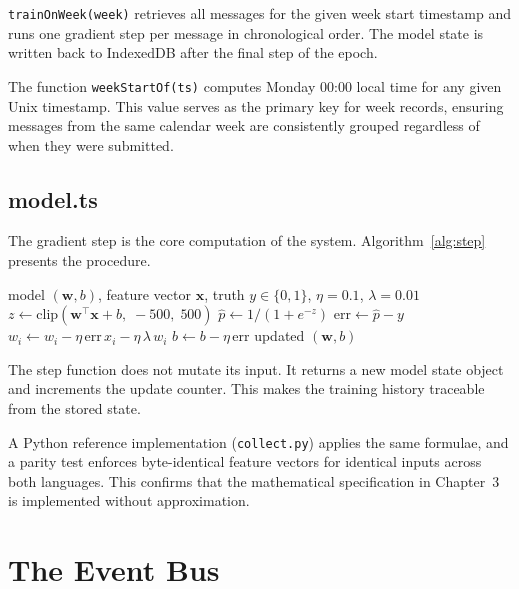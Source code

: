 \documentclass[11pt, a4paper]{report}
\begin{document}
\texttt{trainOnWeek(week)} retrieves all messages for the given week start
timestamp and runs one gradient step per message in chronological order.
The model state is written back to IndexedDB after the final step of the
epoch.

The function \texttt{weekStartOf(ts)} computes Monday 00:00 local time for
any given Unix timestamp. This value serves as the primary key for week
records, ensuring messages from the same calendar week are consistently
grouped regardless of when they were submitted.

\subsection{model.ts}

The gradient step is the core computation of the system. Algorithm~\ref{alg:step}
presents the procedure.

\begin{algorithm}[H]
\caption{Single gradient step}
\label{alg:step}
\begin{algorithmic}[1]
\Require model $(\mathbf{w}, b)$, feature vector $\mathbf{x}$,
         truth $y \in \{0,1\}$, $\eta = 0.1$, $\lambda = 0.01$
\State $z \leftarrow \mathrm{clip}(\mathbf{w}^\top\mathbf{x} + b,\;
       -500,\; 500)$
\State $\hat{p} \leftarrow 1/(1 + e^{-z})$
\State $\mathrm{err} \leftarrow \hat{p} - y$
  \State $w_i \leftarrow w_i
         - \eta\,\mathrm{err}\,x_i
         - \eta\,\lambda\,w_i$
\EndFor
\State $b \leftarrow b - \eta\,\mathrm{err}$
\State \Return updated $(\mathbf{w}, b)$
\end{algorithmic}
\end{algorithm}

The step function does not mutate its input. It returns a new model state
object and increments the update counter. This makes the training history
traceable from the stored state.

A Python reference implementation (\texttt{collect.py}) applies the same
formulae, and a parity test enforces byte-identical feature vectors for
identical inputs across both languages. This confirms that the mathematical
specification in Chapter~3 is implemented without approximation.

\section{The Event Bus}
\end{document}
